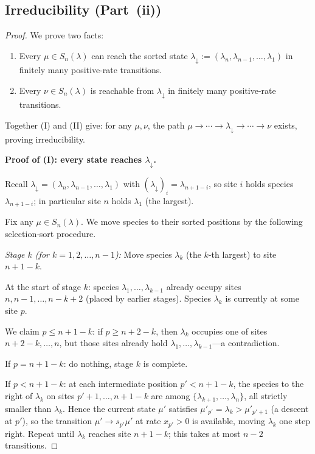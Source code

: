 \documentclass[12pt]{article}
\theoremstyle{definition}
\begin{document}
\subsection{Irreducibility (Part~(ii))}

\begin{proof}
We prove two facts:
\begin{enumerate}[label=(\Roman*)]
  \item Every $\mu \in S_n(\lambda)$ can reach the sorted state
        $\lambda_\downarrow := (\lambda_n, \lambda_{n-1}, \dots, \lambda_1)$
        in finitely many positive-rate transitions.
  \item Every $\nu \in S_n(\lambda)$ is reachable from $\lambda_\downarrow$
        in finitely many positive-rate transitions.
\end{enumerate}
Together (I) and (II) give: for any $\mu,\nu$, the path
$\mu \to \cdots \to \lambda_\downarrow \to \cdots \to \nu$ exists,
proving irreducibility.

\medskip
\noindent\textbf{Proof of (I): every state reaches $\lambda_\downarrow$.}

Recall $\lambda_\downarrow = (\lambda_n, \lambda_{n-1}, \dots, \lambda_1)$
with $(\lambda_\downarrow)_i = \lambda_{n+1-i}$, so site $i$ holds species
$\lambda_{n+1-i}$; in particular site $n$ holds $\lambda_1$ (the largest).

Fix any $\mu \in S_n(\lambda)$.  We move species to their sorted positions
by the following selection-sort procedure.

\smallskip
\emph{Stage $k$ (for $k = 1, 2, \dots, n-1$):}
Move species $\lambda_k$ (the $k$-th largest) to site $n+1-k$.

At the start of stage $k$: species $\lambda_1, \dots, \lambda_{k-1}$
already occupy sites $n, n-1, \dots, n-k+2$ (placed by earlier stages).
Species $\lambda_k$ is currently at some site $p$.

We claim $p \leq n+1-k$: if $p \geq n+2-k$, then $\lambda_k$ occupies
one of sites $n+2-k, \dots, n$, but those sites already hold
$\lambda_1, \dots, \lambda_{k-1}$---a contradiction.

If $p = n+1-k$: do nothing, stage $k$ is complete.

If $p < n+1-k$: at each intermediate position $p' < n+1-k$, the species
to the right of $\lambda_k$ on sites $p'+1, \dots, n+1-k$ are among
$\{\lambda_{k+1}, \dots, \lambda_n\}$, all strictly smaller than $\lambda_k$.
Hence the current state $\mu'$ satisfies $\mu'_{p'} = \lambda_k >
\mu'_{p'+1}$ (a descent at $p'$), so the transition $\mu' \to s_{p'}\mu'$
at rate $x_{p'} > 0$ is available, moving $\lambda_k$ one step right.
Repeat until $\lambda_k$ reaches site $n+1-k$; this takes at most $n-2$
transitions.


\end{proof}
\end{document}
